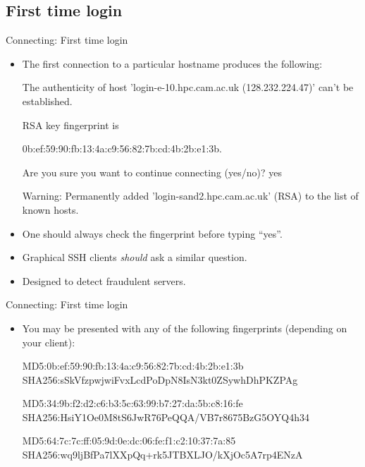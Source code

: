 \subsection{First time login}
\begin{frame}{Connecting: First time login}
\begin{itemize}
\item{The first connection to a particular hostname produces the following:}
\begin{semiverbatim}\footnotesize
The authenticity of host 'login-e-10.hpc.cam.ac.uk  (128.232.224.47)' can't be established.

RSA key fingerprint is

{0b:ef:59:90:fb:13:4a:c9:56:82:7b:cd:4b:2b:e1:3b}.

Are you sure you want to continue connecting (yes/no)? {yes}

Warning: Permanently added 'login-sand2.hpc.cam.ac.uk' (RSA) to the list of known hosts.
\end{semiverbatim}
\smallskip\item{\alert{One should always check the fingerprint before typing ``yes''.}}
\item{Graphical SSH clients \emph{should} ask a similar question.}
\item{Designed to detect fraudulent servers.}
\end{itemize}
\end{frame}

\begin{frame}[fragile]{Connecting: First time login}
\begin{itemize}
\item{You may be presented with any of the following fingerprints (depending on your client):}
\begin{semiverbatim}\footnotesize

MD5:0b:ef:59:90:fb:13:4a:c9:56:82:7b:cd:4b:2b:e1:3b
SHA256:sSkVfzpwjwiFvxLcdPoDpN8IsN3kt0ZSywhDhPKZPAg

MD5:34:9b:f2:d2:c6:b3:5c:63:99:b7:27:da:5b:c8:16:fe
SHA256:HsiY1Oe0M8tS6JwR76PeQQA/VB7r8675BzG5OYQ4h34

MD5:64:7c:7c:ff:05:9d:0e:dc:06:fe:f1:c2:10:37:7a:85
SHA256:wq9ljBfPa7lXXpQq+rk5JTBXLJO/kXjOc5A7rp4ENzA

\end{semiverbatim}
\end{itemize}
\end{frame}

